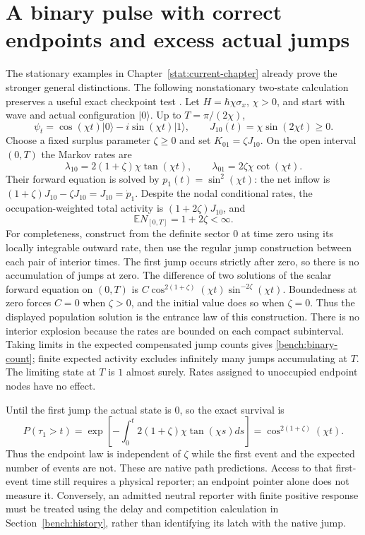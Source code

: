 \documentclass[11pt,oneside,openany]{book}
\theoremstyle{definition}
\theoremstyle{remark}\newtheorem{remark}[theorem]{Remark}
\begin{document}
\section{A binary pulse with correct endpoints and excess actual jumps}
\label{bench:binary-surplus}

The stationary examples in Chapter~\ref{stat:current-chapter} already prove
the stronger general distinctions. The following nonstationary two-state
calculation preserves a useful exact checkpoint test \cite{C02,C03}.
Let $H=\hbar\chi\sigma_x$, $\chi>0$, and start with wave and actual
configuration $|0\rangle$. Up to $T=\pi/(2\chi)$,
\[
 \psi_t=\cos(\chi t)|0\rangle-i\sin(\chi t)|1\rangle,
 \qquad J_{10}(t)=\chi\sin(2\chi t)\geq0.
\]
Choose a fixed surplus parameter $\zeta\geq0$ and set
$K_{01}=\zeta J_{10}$. On the open interval $(0,T)$ the Markov rates are
\begin{equation}
 \lambda_{10}=2(1+\zeta)\chi\tan(\chi t),\qquad
 \lambda_{01}=2\zeta\chi\cot(\chi t).
 \label{bench:binary-rates}
\end{equation}
Their forward equation is solved by
$p_1(t)=\sin^2(\chi t)$: the net inflow is
$(1+\zeta)J_{10}-\zeta J_{10}=J_{10}=\dot p_1$.
Despite the nodal conditional rates, the occupation-weighted total
activity is $(1+2\zeta)J_{10}$, and
\begin{equation}
 \mathbb E N_{[0,T]}=1+2\zeta<\infty.
 \label{bench:binary-count}
\end{equation}
For completeness, construct from the definite sector $0$ at time zero
using its locally integrable outward rate, then use the regular jump
construction between each pair of interior times. The first jump occurs
strictly after zero, so there is no accumulation of jumps at zero.
The difference of two solutions of the scalar forward equation on
$(0,T)$ is
$C\cos^{2(1+\zeta)}(\chi t)\sin^{-2\zeta}(\chi t)$.
Boundedness at zero forces $C=0$ when $\zeta>0$, and the initial value
does so when $\zeta=0$. Thus the displayed population solution is the
entrance law of this construction. There is no interior explosion
because the rates are bounded on each compact subinterval. Taking
limits in the expected compensated jump counts gives
\eqref{bench:binary-count}; finite expected activity excludes infinitely
many jumps accumulating at $T$. The limiting state at $T$ is $1$ almost
surely. Rates assigned to unoccupied endpoint nodes have no effect.

Until the first jump the actual state is $0$, so the exact survival is
\begin{equation}
 P(\tau_1>t)=\exp\!\left[-\int_0^t
                 2(1+\zeta)\chi\tan(\chi s)ds\right]
             =\cos^{2(1+\zeta)}(\chi t).
 \label{bench:binary-first}
\end{equation}
Thus the endpoint law is independent of $\zeta$ while the first event
and the expected number of events are not. These are native path
predictions. Access to that first-event time still requires a physical
reporter; an endpoint pointer alone does not measure it. Conversely, an
admitted neutral reporter with finite positive response must be treated
using the delay and competition calculation in
Section~\ref{bench:history}, rather than identifying its latch with the
native jump.
\end{document}
